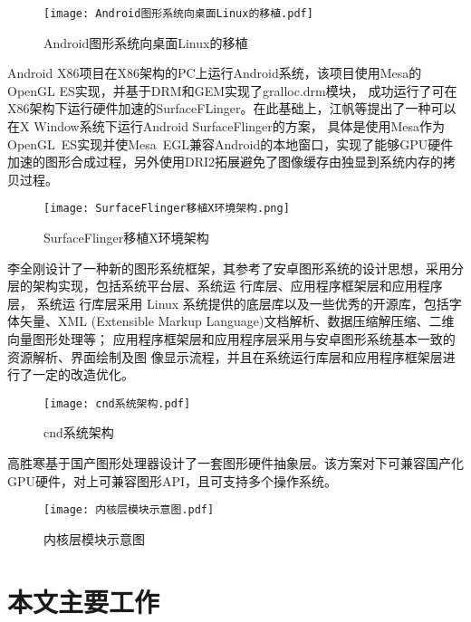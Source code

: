 \begin{figure}[H]
  \centering
  \texttt{[image: Android图形系统向桌面Linux的移植.pdf]}
  \caption{Android图形系统向桌面Linux的移植\cite{张超2012Android}}
\end{figure}

Android X86项目在X86架构的PC上运行Android系统，该项目使用Mesa\cite{mesa}的OpenGL ES实现，并基于DRM\cite{DRM}和GEM\cite{GEM}实现了gralloc.drm模块，
成功运行了可在X86架构下运行硬件加速的SurfaceFLinger\cite{AndroidX86}。在此基础上，江帆等提出了一种可以在X Window系统下运行Android SurfaceFlinger的方案，
具体是使用Mesa作为OpenGL ES实现并使Mesa EGL兼容Android的本地窗口，实现了能够GPU硬件加速的图形合成过程，另外使用DRI2拓展避免了图像缓存由独显到系统内存的拷贝过程\cite{XTYY201710015}。

\begin{figure}[H]
  \centering
  \texttt{[image: SurfaceFlinger移植X环境架构.png]}
  \caption{SurfaceFlinger移植X环境架构\cite{XTYY201710015}}
\end{figure}

李全刚设计了一种新的图形系统框架，其参考了安卓图形系统的设计思想，采用分层的架构实现，包括系统平台层、系统运 行库层、应用程序框架层和应用程序层，
系统运 行库层采用 Linux 系统提供的底层库以及一些优秀的开源库，包括字体矢量、XML (Extensible Markup Language)文档解析、数据压缩解压缩、二维向量图形处理等；
应用程序框架层和应用程序层采用与安卓图形系统基本一致的资源解析、界面绘制及图 像显示流程，并且在系统运行库层和应用程序框架层进行了一定的改造优化\cite{1016779798.nh}。
\begin{figure}[H]
  \centering
  \texttt{[image: cnd系统架构.pdf]}
  \caption{cnd系统架构\cite{1016779798.nh}}
\end{figure}

高胜寒基于国产图形处理器设计了一套图形硬件抽象层\cite{高胜寒2019基于国产}。该方案对下可兼容国产化GPU硬件，对上可兼容图形API，且可支持多个操作系统。

\begin{figure}[H]
  \centering
  \texttt{[image: 内核层模块示意图.pdf]}
  \caption{内核层模块示意图\cite{高胜寒2019基于国产}}
\end{figure}

\section{本文主要工作}

